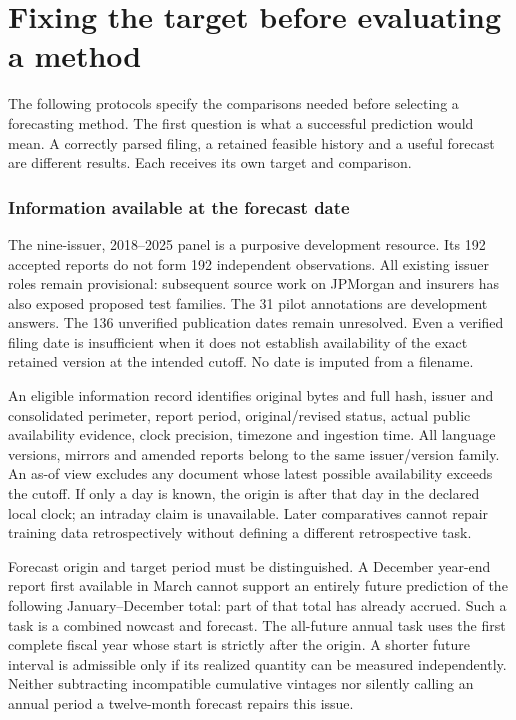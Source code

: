\section{Fixing the target before evaluating a method}
\label{sec:future-validation-targets}

The following protocols specify the comparisons needed before selecting a forecasting method. The first question is what a successful prediction would mean. A correctly parsed filing, a retained feasible history and a useful forecast are different results. Each receives its own target and comparison.

\hypertarget{information-available-at-the-forecast-date}{%
\subsubsection{Information available at the forecast date}\label{information-available-at-the-forecast-date}}

The nine-issuer, 2018--2025 panel is a purposive development resource. Its 192 accepted reports do not form 192 independent observations. All existing issuer roles remain provisional: subsequent source work on JPMorgan and insurers has also exposed proposed test families. The 31 pilot annotations are development answers. The 136 unverified publication dates remain unresolved. Even a verified filing date is insufficient when it does not establish availability of the exact retained version at the intended cutoff. No date is imputed from a filename.

An eligible information record identifies original bytes and full hash, issuer and consolidated perimeter, report period, original/revised status, actual public availability evidence, clock precision, timezone and ingestion time. All language versions, mirrors and amended reports belong to the same issuer/version family. An as-of view excludes any document whose latest possible availability exceeds the cutoff. If only a day is known, the origin is after that day in the declared local clock; an intraday claim is unavailable. Later comparatives cannot repair training data retrospectively without defining a different retrospective task.

Forecast origin and target period must be distinguished. A December year-end report first available in March cannot support an entirely future prediction of the following January--December total: part of that total has already accrued. Such a task is a combined nowcast and forecast. The all-future annual task uses the first complete fiscal year whose start is strictly after the origin. A shorter future interval is admissible only if its realized quantity can be measured independently. Neither subtracting incompatible cumulative vintages nor silently calling an annual period a twelve-month forecast repairs this issue.

